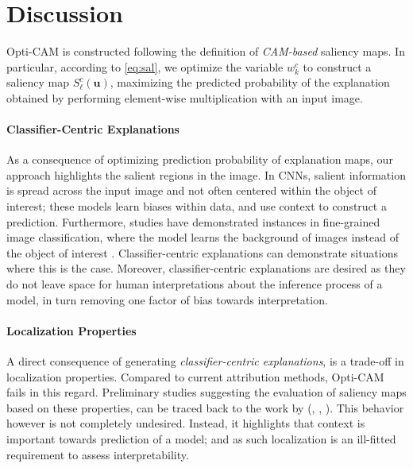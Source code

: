 \section{Discussion}
\label{sec:discuss_opticam}
\noindent Opti-CAM is constructed following the definition of \emph{CAM-based} saliency maps. In 
particular, according to \autoref{eq:sal}, we optimize the variable $w^c_k$ to construct a 
saliency map $S^c_\ell(\mathbf{u})$, maximizing the predicted probability of the explanation 
obtained by performing element-wise multiplication with an input image. \\

\paragraph{Classifier-Centric Explanations} As a consequence of optimizing prediction probability 
of explanation maps, our approach highlights the salient regions in the image. In CNNs, salient 
information is spread across the input image and not often centered within the object of interest; 
these models learn biases within data, and use context to construct a prediction. Furthermore, 
studies have demonstrated instances in fine-grained image classification, where the model learns 
the background of images instead of the object of interest \autocite{petryk2022guiding}. 
Classifier-centric explanations can demonstrate situations where this is the case. Moreover, 
classifier-centric explanations are desired as they do not leave space for human interpretations 
about the inference process of a model, in turn removing one factor of bias towards interpretation.\\

\paragraph{Localization Properties} A direct consequence of generating \emph{classifier-centric 
explanations}, is a trade-off in localization properties. Compared to current 
attribution methods, Opti-CAM fails in this regard. Preliminary studies suggesting the evaluation 
of saliency maps based on these properties, can be traced back to the work by (\cite{shetty2019not}, 
\cite{zhou2018interpreting}, \cite{rao2022towards}). This behavior however is not completely 
undesired. Instead, it highlights that context is important towards prediction of a model; and as 
such localization is an ill-fitted requirement to assess interpretability.\\


